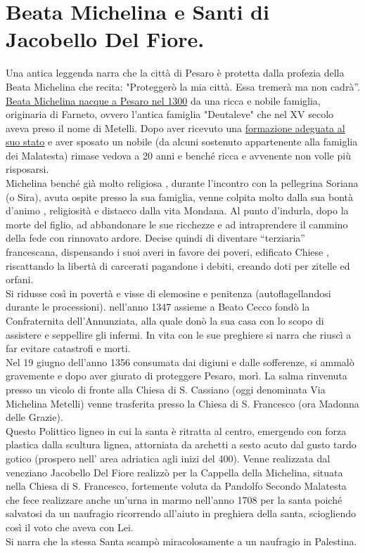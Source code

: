 \documentclass[12pt,a4paper]{article}
\begin{document}
	\section{Beata Michelina e Santi di Jacobello Del Fiore.}
	Una antica leggenda narra che la città di Pesaro è protetta dalla profezia della Beata Michelina che recita: "Proteggerò la mia città. Essa tremerà ma non cadrà”.\\
	\underline{Beata Michelina nacque a Pesaro nel 1300} da una ricca e nobile famiglia, originaria di Farneto, ovvero l’antica famiglia "Deutaleve" che nel XV secolo aveva preso il nome di Metelli. Dopo aver ricevuto una \underline{formazione adeguata al suo stato} e aver sposato un nobile (da alcuni sostenuto appartenente alla famiglia dei Malatesta) rimase vedova a 20 anni e benché ricca e avvenente non volle più risposarsi.\\
	Michelina benché già molto religiosa , durante l'incontro con la  pellegrina Soriana (o Sira), avuta ospite presso la sua famiglia, venne colpita molto dalla sua bontà d'animo , religiosità e distacco dalla vita Mondana. Al punto d'indurla, dopo la morte del figlio, ad abbandonare le sue ricchezze e ad intraprendere il cammino della fede con rinnovato ardore. Decise quindi di diventare “terziaria” francescana, dispensando i suoi averi in favore dei poveri, edificato Chiese , riscattando la libertà di carcerati pagandone i debiti, creando doti per zitelle ed orfani.\\
	Si ridusse così in povertà e visse di elemosine e penitenza (autoflagellandosi durante le processioni). nell'anno 1347 assieme a Beato Cecco fondò la Confraternita dell’Annunziata, alla quale donò la sua casa con lo scopo di assistere e seppellire gli infermi. In vita con le sue preghiere si narra che riuscì a far evitare catastrofi e morti.\\
	Nel 19 giugno dell'anno 1356 consumata dai digiuni e dalle sofferenze, si ammalò gravemente e dopo aver giurato di proteggere Pesaro, morì. La salma rinvenuta presso un vicolo di fronte alla Chiesa di S. Cassiano (oggi denominata Via Michelina Metelli) venne trasferita presso la Chiesa di S. Francesco (ora Madonna delle Grazie).\\
	Questo Polittico ligneo in cui la santa è ritratta al centro, emergendo con forza plastica dalla scultura lignea, attorniata da archetti a sesto acuto dal gusto tardo gotico (prospero nell’ area adriatica agli inizi del 400). Venne realizzata dal veneziano Jacobello Del Fiore realizzò per la Cappella della Michelina, situata nella Chiesa di S. Francesco, fortemente voluta da Pandolfo Secondo Malatesta che fece realizzare anche un'urna in marmo nell'anno 1708 per la santa poiché salvatosi da un naufragio ricorrendo all'aiuto in preghiera della santa, sciogliendo così il voto che aveva con Lei.\\
	Si narra che la stessa Santa scampò miracolosamente a un naufragio in Palestina.
	
\end{document}

